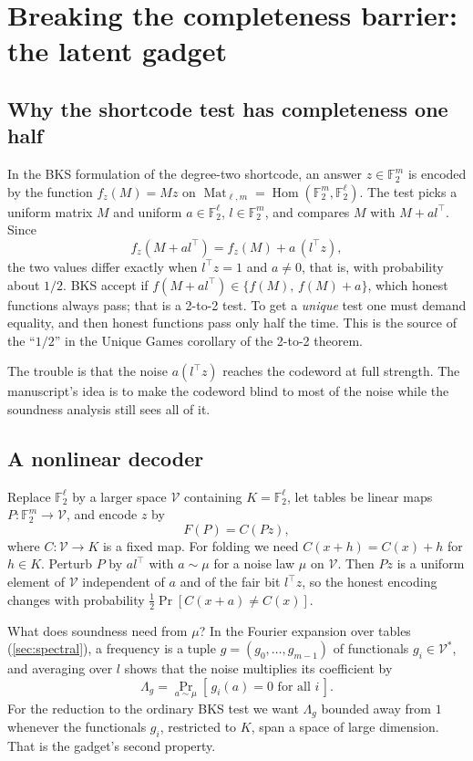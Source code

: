 \documentclass[11pt]{article}
\theoremstyle{definition}
\theoremstyle{remark}
\newcommand{\F}{\mathbb F}
\newcommand{\V}{\mathcal V}
\DeclareMathOperator{\Hom}{Hom}
\DeclareMathOperator{\Mat}{Mat}
\begin{document}
\section{Breaking the completeness barrier: the latent gadget}\label{sec:gadget}

\subsection{Why the shortcode test has completeness one half}\label{sec:barrier}

In the BKS formulation of the degree-two shortcode, an answer $z\in\F_2^m$ is
encoded by the function $f_z(M)=Mz$ on $\Mat_{\ell,m}=\Hom(\F_2^m,\F_2^\ell)$.
The test picks a uniform matrix $M$ and uniform $a\in\F_2^\ell$,
$l\in\F_2^m$, and compares $M$ with $M+al^\top$. Since
\[
f_z(M+al^\top)=f_z(M)+a\,(l^\top z),
\]
the two values differ exactly when $l^\top z=1$ and $a\ne0$, that is, with
probability about $1/2$. BKS accept if $f(M+al^\top)\in\{f(M),\,f(M)+a\}$,
which honest functions always pass; that is a 2-to-2 test. To get a
\emph{unique} test one must demand equality, and then honest functions pass
only half the time. This is the source of the ``$1/2$'' in the Unique Games
corollary of the 2-to-2 theorem.

The trouble is that the noise $a(l^\top z)$ reaches the codeword at full
strength. The manuscript's idea is to make the codeword blind to most of the
noise while the soundness analysis still sees all of it.

\subsection{A nonlinear decoder}

Replace $\F_2^\ell$ by a larger space $\V$ containing $K=\F_2^\ell$, let
tables be linear maps $P\colon\F_2^m\to\V$, and encode $z$ by
\[
F(P)=C(Pz),
\]
where $C\colon\V\to K$ is a fixed map. For folding we need
$C(x+h)=C(x)+h$ for $h\in K$. Perturb $P$ by $al^\top$ with $a\sim\mu$ for a
noise law $\mu$ on $\V$. Then $Pz$ is a uniform element of $\V$ independent of
$a$ and of the fair bit $l^\top z$, so the honest encoding changes with
probability $\tfrac12\Pr[C(x+a)\ne C(x)]$.

What does soundness need from $\mu$? In the Fourier expansion over tables
(\cref{sec:spectral}), a frequency is a tuple $g=(g_0,\dots,g_{m-1})$ of
functionals $g_i\in\V^*$, and averaging over $l$ shows that the noise
multiplies its coefficient by
\[
\Lambda_g=\Pr_{a\sim\mu}[\,g_i(a)=0\text{ for all }i\,].
\]
For the reduction to the ordinary BKS test we want $\Lambda_g$ bounded away
from $1$ whenever the functionals $g_i$, restricted to $K$, span a space of
large dimension. That is the gadget's second property.
\end{document}

